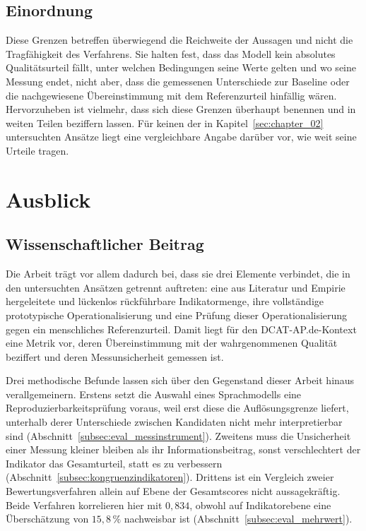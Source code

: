 \subsection{Einordnung}
Diese Grenzen betreffen überwiegend die Reichweite der Aussagen und nicht die
Tragfähigkeit des Verfahrens. Sie halten fest, dass das Modell kein absolutes
Qualitätsurteil fällt, unter welchen Bedingungen seine Werte gelten und wo seine
Messung endet, nicht aber, dass die gemessenen Unterschiede zur Baseline oder die
nachgewiesene Übereinstimmung mit dem Referenzurteil hinfällig wären.
Hervorzuheben ist vielmehr, dass sich diese Grenzen überhaupt benennen und in
weiten Teilen beziffern lassen. Für keinen der in Kapitel~\ref{sec:chapter_02}
untersuchten Ansätze liegt eine vergleichbare Angabe darüber vor, wie weit seine
Urteile tragen.

\section{Ausblick}
\label{sec:fazit_ausblick}

\subsection{Wissenschaftlicher Beitrag}
Die Arbeit trägt vor allem dadurch bei, dass sie drei Elemente verbindet, die in
den untersuchten Ansätzen getrennt auftreten: eine aus Literatur und Empirie
hergeleitete und lückenlos rückführbare Indikatormenge, ihre vollständige
prototypische Operationalisierung und eine Prüfung dieser Operationalisierung
gegen ein menschliches Referenzurteil. Damit liegt für den DCAT-AP.de-Kontext eine
Metrik vor, deren Übereinstimmung mit der wahrgenommenen Qualität beziffert und
deren Messunsicherheit gemessen ist.

Drei methodische Befunde lassen sich über den Gegenstand dieser Arbeit hinaus
verallgemeinern. Erstens setzt die Auswahl eines Sprachmodells eine
Reproduzierbarkeitsprüfung voraus, weil erst diese die Auflösungsgrenze liefert,
unterhalb derer Unterschiede zwischen Kandidaten nicht mehr interpretierbar sind
(Abschnitt~\ref{subsec:eval_messinstrument}). Zweitens muss die Unsicherheit
einer Messung kleiner bleiben als ihr Informationsbeitrag, sonst verschlechtert
der Indikator das Gesamt\-urteil, statt es zu verbessern
(Abschnitt~\ref{subsec:kongruenzindikatoren}). Drittens ist ein Vergleich zweier Bewertungsverfahren allein auf Ebene der
Gesamtscores nicht aussagekräftig. Beide Verfahren korrelieren hier mit
$0{,}834$, obwohl auf Indikatorebene eine Überschätzung von $15{,}8\,\%$
nachweisbar ist (Abschnitt~\ref{subsec:eval_mehrwert}).

